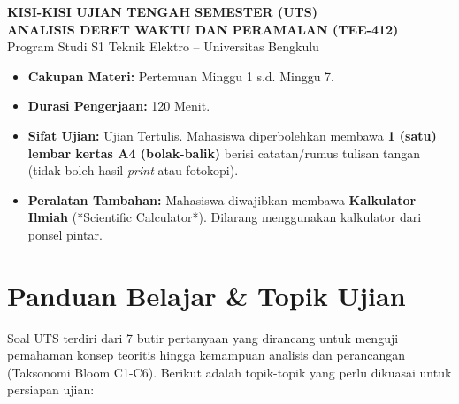 \documentclass[11pt,a4paper]{article}
\begin{document}
\begin{center}
    {\large \textbf{\color{primaryblue}KISI-KISI UJIAN TENGAH SEMESTER (UTS)}}\\[0.15cm]
    {\Large \textbf{\color{goldaccent}ANALISIS DERET WAKTU DAN PERAMALAN (TEE-412)}}\\[0.1cm]
    {\normalsize Program Studi S1 Teknik Elektro -- Universitas Bengkulu}
\end{center}

\vspace{0.3cm}

\begin{tcolorbox}[colback=boxbg,colframe=primaryblue,arc=2mm,title=\textbf{Informasi Pelaksanaan Ujian}]
\small
\begin{itemize}[leftmargin=1.5em, itemsep=3pt]
    \item \textbf{Cakupan Materi:} Pertemuan Minggu 1 s.d. Minggu 7.
    \item \textbf{Durasi Pengerjaan:} 120 Menit.
    \item \textbf{Sifat Ujian:} Ujian Tertulis. Mahasiswa diperbolehkan membawa \textbf{1 (satu) lembar kertas A4 (bolak-balik)} berisi catatan/rumus tulisan tangan (tidak boleh hasil \textit{print} atau fotokopi).
    \item \textbf{Peralatan Tambahan:} Mahasiswa diwajibkan membawa \textbf{Kalkulator Ilmiah} (*Scientific Calculator*). Dilarang menggunakan kalkulator dari ponsel pintar.
\end{itemize}
\end{tcolorbox}

\vspace{0.4cm}
\section{Panduan Belajar \& Topik Ujian}

Soal UTS terdiri dari 7 butir pertanyaan yang dirancang untuk menguji pemahaman konsep teoritis hingga kemampuan analisis dan perancangan (Taksonomi Bloom C1-C6). Berikut adalah topik-topik yang perlu dikuasai untuk persiapan ujian:
\end{document}
